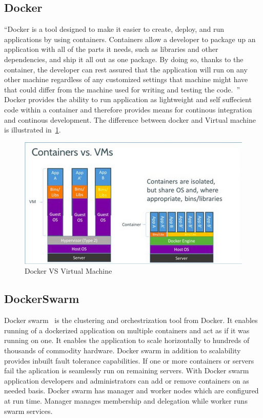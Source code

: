 \subsection{Docker}

``Docker is a tool designed to make it easier to create, deploy, and
run applications by using containers. Containers allow a developer to
package up an application with all of the parts it needs, such as
libraries and other dependencies, and ship it all out as one
package. By doing so, thanks to the container, the developer can rest
assured that the application will run on any other machine regardless
of any customized settings that machine might have that could differ
from the machine used for writing and testing the
code.~\cite{hid-sp18-413-docker}'' Docker provides the ability to run
application as lightweight and self suffecient code within a container
and therefore provides means for continous integration and continous
development. The difference between docker and Virtual machine is
illustrated in~\ref{f:contvsvm}.

\begin{figure}[!ht]
	\centering\includegraphics[width=\columnwidth]{images/dockervsvm.png}
	 \caption{Docker VS Virtual Machine}\label{f:contvsvm}
\end{figure}

\subsection{DockerSwarm}

Docker swarm~\cite{hid-sp18-413-dockerswarm} is the clustering and
orchestrization tool from Docker. It enables running of a dockerized
application on multiple containers and act as if it was running on
one. It enables the application to scale horizontally to hundreds of
thousands of commodity hardware. Docker swarm in addition to
scalability provides inbuilt fault tolerance capabilities. If one or
more containers or servers fail the aplication is seamlessly run on
remaining servers. With Docker swarm application developers and
administrators can add or remove containers on as needed basis. Docker
swarm has manager and worker nodes which are configured at run
time. Manager manages membership and delegation while worker runs
swarm services.

